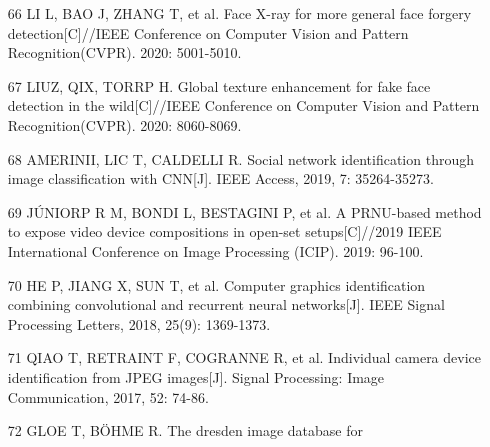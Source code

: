 \documentclass{article}
\begin{document}
\begin{itemize}
\item 
[66] LI L, BAO J, ZHANG T, et al. Face X-ray for more general face forgery detection[C]//IEEE Conference on Computer Vision and Pattern Recognition(CVPR). 2020: 5001-5010.

\item 
[67] LIUZ, QIX, TORRP H. Global texture enhancement for fake face detection in the wild[C]//IEEE Conference on Computer Vision and Pattern Recognition(CVPR). 2020: 8060-8069.

\item 
[68] AMERINII, LIC T, CALDELLI R. Social network identification through image classification with CNN[J]. IEEE Access, 2019, 7: 35264-35273.

\item 
[69] JÚNIORP R M, BONDI L, BESTAGINI P, et al. A PRNU-based method to expose video device compositions in open-set setups[C]//2019 IEEE International Conference on Image Processing (ICIP). 2019: 96-100.

\item 
[70] HE P, JIANG X, SUN T, et al. Computer graphics identification combining convolutional and recurrent neural networks[J]. IEEE Signal Processing Letters, 2018, 25(9): 1369-1373.

\item 
[71] QIAO T, RETRAINT F, COGRANNE R, et al. Individual camera device identification from JPEG images[J]. Signal Processing: Image Communication, 2017, 52: 74-86.

\item 
[72] GLOE T, BÖHME R. The dresden image database for

\end{itemize}
\end{document}
